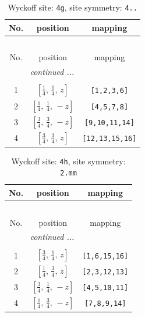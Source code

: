 \documentclass[fleqn,8pt]{jsarticle}
\begin{document}
\renewcommand{\arraystretch}{1.2}
\begin{longtable}{ccc}
\caption{Wyckoff site: {\tt 4g}, site symmetry: {\tt 4..}}
 \\
 \hline \hline
No. & position & mapping \\ \hline \endfirsthead

\multicolumn{2}{l}{\tablename\ \thetable{}} \\
 \hline \hline
No. & position & mapping \\ \hline \endhead

 \hline \hline
\multicolumn{2}{r}{\footnotesize\it continued ...} \\ \endfoot

 \hline \hline
\multicolumn{2}{r}{} \\ \endlastfoot

1 & $\left[ \frac{1}{4},\, \frac{1}{4},\, z \right]$ & {\tt [1,2,3,6]} \\ \hline
2 & $\left[ \frac{1}{4},\, \frac{1}{4},\, - z \right]$ & {\tt [4,5,7,8]} \\ \hline
3 & $\left[ \frac{3}{4},\, \frac{3}{4},\, - z \right]$ & {\tt [9,10,11,14]} \\ \hline
4 & $\left[ \frac{3}{4},\, \frac{3}{4},\, z \right]$ & {\tt [12,13,15,16]} \\
\end{longtable}
\renewcommand{\arraystretch}{1.2}
\begin{longtable}{ccc}
\caption{Wyckoff site: {\tt 4h}, site symmetry: {\tt 2.mm}}
 \\
 \hline \hline
No. & position & mapping \\ \hline \endfirsthead

\multicolumn{2}{l}{\tablename\ \thetable{}} \\
 \hline \hline
No. & position & mapping \\ \hline \endhead

 \hline \hline
\multicolumn{2}{r}{\footnotesize\it continued ...} \\ \endfoot

 \hline \hline
\multicolumn{2}{r}{} \\ \endlastfoot

1 & $\left[ \frac{3}{4},\, \frac{1}{4},\, z \right]$ & {\tt [1,6,15,16]} \\ \hline
2 & $\left[ \frac{1}{4},\, \frac{3}{4},\, z \right]$ & {\tt [2,3,12,13]} \\ \hline
3 & $\left[ \frac{3}{4},\, \frac{1}{4},\, - z \right]$ & {\tt [4,5,10,11]} \\ \hline
4 & $\left[ \frac{1}{4},\, \frac{3}{4},\, - z \right]$ & {\tt [7,8,9,14]} \\
\end{longtable}
\end{document}
